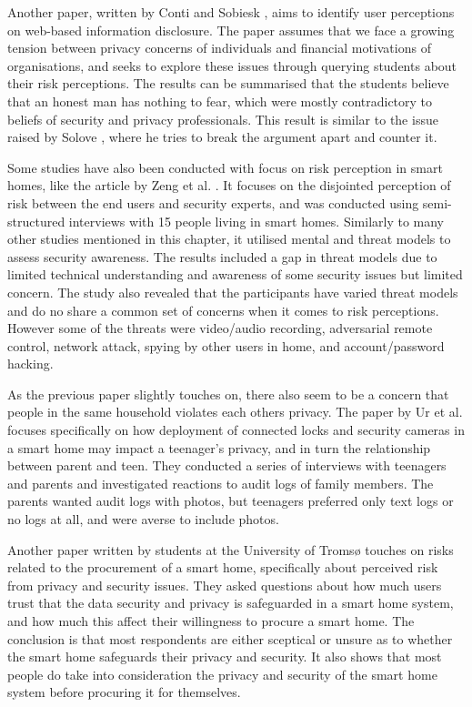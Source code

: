 Another paper, written by Conti and Sobiesk \cite{Conti2007}, aims to identify user perceptions on web-based information disclosure. The paper assumes that we face a growing tension between privacy concerns of individuals and financial motivations of organisations, and seeks to explore these issues through querying students about their risk perceptions. The results can be summarised that the students believe that an honest man has nothing to fear, which were mostly contradictory to beliefs of security and privacy professionals. This result is similar to the issue raised by Solove \cite{Solove2007}, where he tries to break the argument apart and counter it. 

Some studies have also been conducted with focus on risk perception in smart homes, like the article by Zeng et al. \cite{Zeng:2017:EUS:3235924.3235931}. It focuses on the disjointed perception of risk between the end users and security experts, and was conducted using semi-structured interviews with 15 people living in smart homes. Similarly to many other studies mentioned in this chapter, it utilised mental and threat models to assess security awareness. The results included a gap in threat models due to limited technical understanding and awareness of some security issues but limited concern. The study also revealed that the participants have varied threat models and do no share a common set of concerns when it comes to risk perceptions. However some of the threats were video/audio recording, adversarial remote control, network attack, spying by other users in home, and account/password hacking. 

As the previous paper slightly touches on, there also seem to be a concern that people in the same household violates each others privacy. The paper by Ur et al. \cite{Ur:2014:IVI:2632048.2632107} focuses specifically on how deployment of connected locks and security cameras in a smart home may impact a teenager's privacy, and in turn the relationship between parent and teen. They conducted a series of interviews with teenagers and parents and investigated reactions to audit logs of family members. The parents wanted audit logs with photos, but teenagers preferred only text logs or no logs at all, and were averse to include photos. 

Another paper \cite{Tangstad2017} written by students at the University of Tromsø touches on risks related to the procurement of a smart home, specifically about perceived risk from privacy and security issues. They asked questions about how much users trust that the data security and privacy is safeguarded in a smart home system, and how much this affect their willingness to procure a smart home. The conclusion is that most respondents are either sceptical or unsure as to whether the smart home safeguards their privacy and security. It also shows that most people do take into consideration the privacy and security of the smart home system before procuring it for themselves. 

